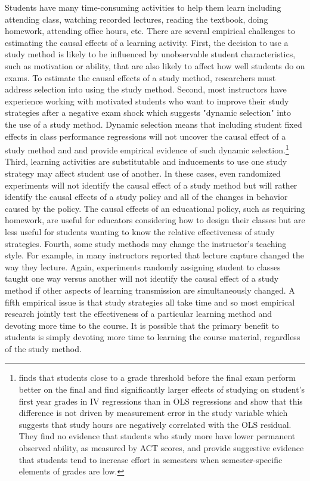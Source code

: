 \documentclass[12pt]{article}
\begin{document}
Students have many time-consuming activities to help them learn including attending class, watching recorded lectures, reading the textbook, doing homework, attending office hours, etc. There are several empirical challenges to estimating the causal effects of a learning activity. First, the decision to use a study method is likely to be influenced by unobservable student characteristics, such as motivation or ability, that are also likely to affect how well students do on exams. To estimate the causal effects of a study method, researchers must address selection into using the study method. Second, most instructors have experience working with motivated students who want to improve their study strategies after a negative exam shock which suggests "dynamic selection" into the use of a study method. Dynamic selection means that including student fixed effects in class performance regressions will not uncover the causal effect of a study method and \textcite{oettinger2002} and \textcite{ss2008} provide empirical evidence of such dynamic selection.\footnote{\textcite{oettinger2002} finds that students close to a grade threshold before the final exam perform better on the final and \textcite{ss2008} find significantly larger effects of studying on student's first year grades in IV regressions than in OLS regressions and show that this difference is not driven by measurement error in the study variable which suggests that study hours are negatively correlated with the OLS residual.  They find no evidence that students who study more have lower permanent observed ability, as measured by ACT scores, and provide suggestive evidence that students tend to increase effort in semesters when semester-specific elements of grades are low.}  Third, learning activities are substitutable and inducements to use one study strategy may affect student use of another. In these cases, even randomized experiments will not identify the causal effect of a study method but will rather identify the causal effects of a study policy and all of the changes in behavior caused by the policy. The causal effects of an educational policy, such as requiring homework, are useful for educators considering how to design their classes but are less useful for students wanting to know the relative effectiveness of study strategies. Fourth, some study methods may change the instructor's teaching style.  For example, in \textcite{msc2019} many instructors reported that lecture capture changed the way they lecture.  Again, experiments randomly assigning student to classes taught one way versus another will not identify the causal effect of a study method if other aspects of learning transmission are simultaneously changed. %
A fifth empirical issue is that study strategies all take time and so most empirical research jointly test the effectiveness of a particular learning method and devoting more time to the course. It is possible that the primary benefit to students is simply devoting more time to learning the course material, regardless of the study method.
\end{document}
